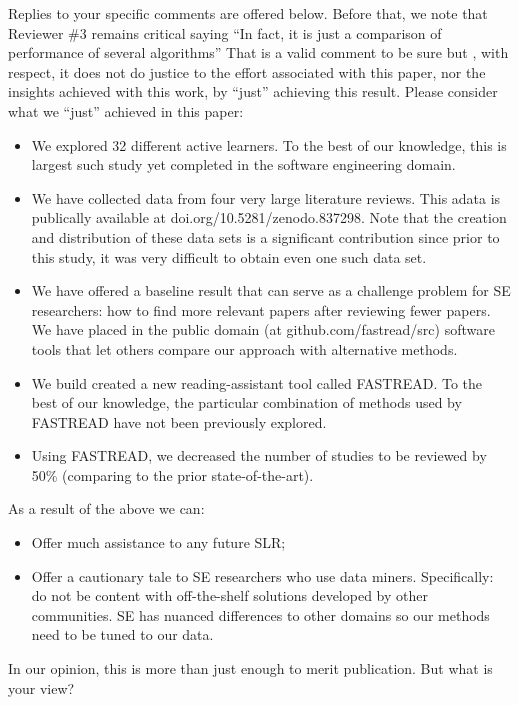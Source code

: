 \documentclass{svjour3}
\theoremstyle{break}
\begin{document}
Replies to your specific comments are offered below.
Before that, we note that Reviewer \#3 remains critical saying ``In fact, it is just a comparison of performance of several algorithms'' That is a valid comment to be sure  but , with respect, it does not do justice to the effort
associated with this paper, nor the insights achieved with
this work, by ``just'' achieving this result. Please consider what  we ``just'' achieved in this paper:
\begin{itemize}
\item
We explored 32 different active learners. To the best of our knowledge, this is largest
such study yet completed in the software engineering domain. 
\item
We  have collected data from four very large literature reviews. This adata is publically available at
doi.org/10.5281/zenodo.837298. Note that the creation and distribution of these data sets is a significant contribution since prior to this study, it was  very difficult to obtain even one such data set. 
\item
We have offered a baseline result that can serve
as a challenge problem for SE researchers: how to find more relevant
papers after reviewing fewer  papers. 
We  have  placed in the public domain (at github.com/fastread/src) software
tools that let others compare our approach with alternative methods.
\item
We build created a new reading-assistant tool called FASTREAD.
To the best of our knowledge, the particular combination of methods used by FASTREAD have not been previously explored.
\item
Using FASTREAD, we decreased the number of studies to be reviewed by 50\% (comparing to the prior state-of-the-art).
\end{itemize}
As a result  of the above we can:
\begin{itemize}
\item Offer much assistance to any future SLR;
\item Offer a cautionary tale to SE 
researchers who use data miners. Specifically: do not be content with off-the-shelf solutions developed
by other communities. SE   has nuanced differences to other domains so our methods need to be tuned to our data.
\end{itemize}
In our opinion, this is more than just enough to merit publication. But what is your view?

\par~
\end{document}
